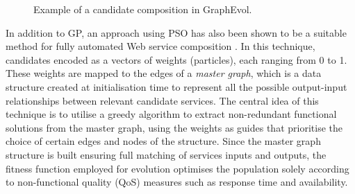 \documentclass{article}
\begin{document}
\begin{figure}
\centerline{
}
\caption{Example of a candidate composition in GraphEvol.}
\label{fig:graphExample}
\end{figure}

In addition to GP, an approach using PSO has also been shown to be a suitable method for fully automated Web service composition \cite{silva2014graph}. In this technique, candidates encoded as a vectors of weights (particles), each ranging from 0 to 1. These weights are mapped to the edges of a \textit{master graph}, which is a data structure created at 
initialisation time to represent all the possible output-input relationships between relevant candidate services. The central idea of this technique is to utilise a greedy algorithm
to extract non-redundant functional solutions from the master graph, using the weights as guides that prioritise the choice of certain edges and nodes of the structure.
Since
the master graph structure is built ensuring full matching of services inputs and outputs, the fitness function employed for evolution optimises the population solely according to non-functional quality (QoS) measures such as response time and availability.
\end{document}
